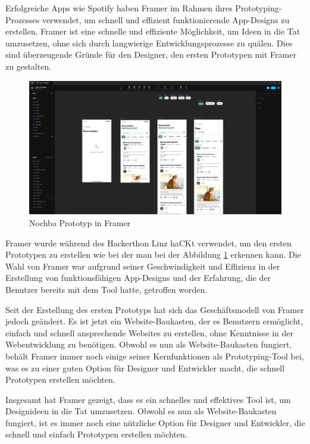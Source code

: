Erfolgreiche Apps wie Spotify haben Framer im Rahmen ihres
Prototyping-Prozesses verwendet, um schnell und effizient
funktionierende App-Designs zu erstellen. Framer ist eine
schnelle und effiziente Möglichkeit, um Ideen in die Tat
umzusetzen, ohne sich durch langwierige Entwicklungsprozesse
zu quälen. Dies sind überzeugende Gründe für den Designer, den ersten Prototypen mit Framer zu gestalten.

\begin{figure}[H]
  \centering
  \includegraphics[width=1\textwidth]{pics/nochba-framer-prototype-screenshot.png}
  \caption{Nochba Prototyp in Framer}
  \label{fig:framer-prototype}
\end{figure}


Framer wurde während des Hackerthon Linz haCKt verwendet, um
den ersten Prototypen zu erstellen wie bei der man bei der
Abbildung \ref{fig:framer-prototype} erkennen kann. Die Wahl von Framer war
aufgrund seiner Geschwindigkeit und Effizienz in der
Erstellung von funktionsfähigen App-Designs und der
Erfahrung, die der Benutzer bereits mit dem Tool hatte,
getroffen worden.

Seit der Erstellung des ersten Prototyps hat sich das Geschäftsmodell von Framer jedoch geändert. Es ist jetzt ein Website-Baukasten, der es Benutzern ermöglicht, einfach und schnell ansprechende Websites zu erstellen, ohne Kenntnisse in der Webentwicklung zu benötigen. Obwohl es nun als Website-Baukasten fungiert, behält Framer immer noch einige seiner Kernfunktionen als Prototyping-Tool bei, was es zu einer guten Option für Designer und Entwickler macht, die schnell Prototypen erstellen möchten.

Insgesamt hat Framer gezeigt, dass es ein schnelles und effektives Tool ist, um Designideen in die Tat umzusetzen. Obwohl es nun als Website-Baukasten fungiert, ist es immer noch eine nützliche Option für Designer und Entwickler, die schnell und einfach Prototypen erstellen möchten.

